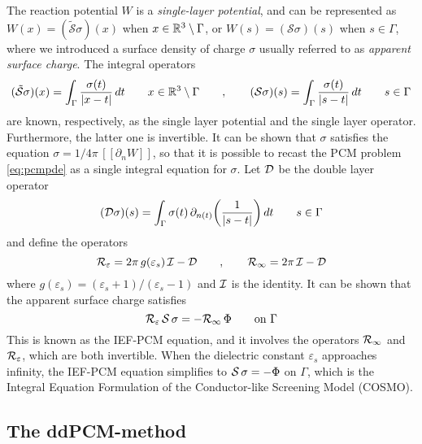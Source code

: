 The reaction potential $W$ is a \emph{single-layer potential}, and can be represented\cite{sauter2010boundary} as $W(x) = (\tilde{\mathcal{S}}\sigma)(x)$ when $x \in \mathbb{R}^3 \setminus \Gamma$, or $W(s) = (\mathcal{S}\sigma)(s)$ when $s \in \Gamma$, where we introduced a surface density of charge $\sigma$ usually referred to as \emph{apparent surface charge}. The integral operators
\begin{equation*}
 (\tilde{\mathcal{S}}\sigma)(x) = \int_{\Gamma} \frac{\sigma(t)}{|x-t|} \, dt \qquad  x \in \mathbb{R}^3 \setminus \Gamma \qquad , \qquad  ({\mathcal{S}}\sigma)(s) = \int_{\Gamma} \frac{\sigma(t)}{|s-t|} \, dt \qquad  s \in \Gamma
\end{equation*}
are known, respectively, as the single layer potential and the single layer operator. Furthermore, the latter one is invertible\cite{Calderon}. It can be shown that $\sigma$ satisfies the equation $\sigma = 1/4\pi \, [\![ \partial_n W]\!]$, so that it is possible to recast the PCM problem \eqref{eq:pcmpde} as a single integral equation for $\sigma$. Let $\mathcal{D}$ be the double layer operator
\begin{equation}\label{eq:DOper}
 ({\mathcal{D}}\sigma)(s) = \int_{\Gamma} \sigma(t) \, \partial_{n(t)} \bigg( \frac{1}{|s-t|}\bigg) \,dt \qquad s \in \Gamma
\end{equation}
and define the operators 
\begin{equation}
 \label{eq:Reps}
 \mathcal{R}_\varepsilon = 2\pi \, g(\varepsilon_s) \, \mathcal{I} - \mathcal{D} \qquad, \qquad \mathcal{R}_\infty = 2\pi \, \mathcal{I} - \mathcal{D}
\end{equation}
where $g(\varepsilon_s) = (\varepsilon_s+1)/(\varepsilon_s-1)$ and $\mathcal{I}$ is the identity. It can be shown\cite{ReviewPCM_2005} that the apparent surface charge satisfies
\begin{equation}
\label{eq:IEFPCM}
\mathcal{R}_\varepsilon \, \mathcal{S} \, \sigma = - \mathcal{R}_\infty \, \Phi \qquad \text{on }\Gamma
\end{equation}
This is known as the IEF-PCM equation, and it involves the operators $\mathcal{R}_\infty$ and $\mathcal{R}_\varepsilon$, which are both invertible. When the dielectric constant $\varepsilon_s$ approaches infinity, the IEF-PCM equation simplifies to $\mathcal{S} \, \sigma = - \Phi$ on $\Gamma$, which is the Integral Equation Formulation of the Conductor-like Screening Model (COSMO)\cite{Lipparini_JCP_VPCM}.


\subsection{The ddPCM-method}


